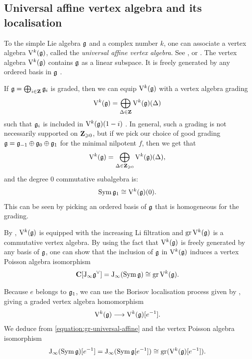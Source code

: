 \subsection{Universal affine vertex algebra and its localisation}

To the simple Lie algebra $\mathfrak g$ and a complex number $k$, one can associate a vertex algebra $\mathrm V^k(\mathfrak g)$, called the \emph{universal affine vertex algebra}. See \cite[Section 2.1]{frenkel1992vertex}, \cite[Section 2.4]{frenkel2004vertex} or \cite[Section 1.8]{desole2006finite}. The vertex algebra $\mathrm V^k(\mathfrak g)$ contains $\mathfrak g$ as a linear subspace. It is freely generated by any ordered basis in $\mathfrak g$ \cite[Proposition 1.20]{desole2006finite}.

If $\mathfrak g = \bigoplus_{i \in \mathbf{Z}} \mathfrak g_i$ is graded, then we can equip $\mathrm V^k(\mathfrak g)$ with a vertex algebra grading
\[ \mathrm V^k(\mathfrak g) = \bigoplus_{\Delta \in \mathbf{Z}} \mathrm V^k(\mathfrak g)(\Delta) \] such that $\mathfrak g_i$ is included in $\mathrm V^k(\mathfrak g)(1 - i)$ \cite[Remark 1.23]{desole2006finite}. In general, such a grading is not necessarily supported on $\mathbf{Z}_{\geqslant 0}$, but if we pick our choice of good grading $\mathfrak g = \mathfrak g_{-1} \oplus \mathfrak g_0 \oplus \mathfrak g_1$ for the minimal nilpotent $f$, then we get that
\begin{equation} \label{equation:grading-universal-affine} 
	\mathrm V^k(\mathfrak g) = \bigoplus_{\Delta \in \mathbf{Z}_{\geqslant 0}} \mathrm V^k(\mathfrak g)(\Delta), 
\end{equation}
and the degree $0$ commutative subalgebra is:
\[ \operatorname{Sym} \mathfrak g_1 \cong \mathrm V^k(\mathfrak g)(0). \]
This can be seen by picking an ordered basis of $\mathfrak g$ that is homogeneous for the grading.

By , $\mathrm V^k(\mathfrak g)$ is equipped with the increasing Li filtration and $\operatorname{gr} \mathrm V^k(\mathfrak g)$ is a commutative vertex algebra. By using the fact that $\mathrm V^k(\mathfrak g)$ is freely generated by any basis of $\mathfrak g$, one can show that the inclusion of $\mathfrak g$ in $\mathrm V^k(\mathfrak g)$ induces a vertex Poisson algebra isomorphism
\begin{equation} \label{equation:gr-universal-affine}
	\mathbf{C}[\mathrm{J}_\infty \mathfrak g^\vee] = \mathrm{J}_\infty(\operatorname{Sym} \mathfrak g) \cong \operatorname{gr} \mathrm V^k(\mathfrak g).
\end{equation}

Because $e$ belongs to $\mathfrak g_1$, we can use the Borisov localisation process given by , giving a graded vertex algebra homomorphism
\[ \mathrm V^k(\mathfrak g) \longrightarrow \mathrm V^k(\mathfrak g)[e^{-1}]. \]
We deduce from \eqref{equation:gr-universal-affine} and  the vertex Poisson algebra isomorphism
\[ \mathrm{J}_\infty(\operatorname{Sym} \mathfrak g)[e^{-1}] = \mathrm{J}_\infty(\operatorname{Sym} \mathfrak g[e^{-1}]) \cong \operatorname{gr} (\mathrm V^k(\mathfrak g)[e^{-1}]). \]

